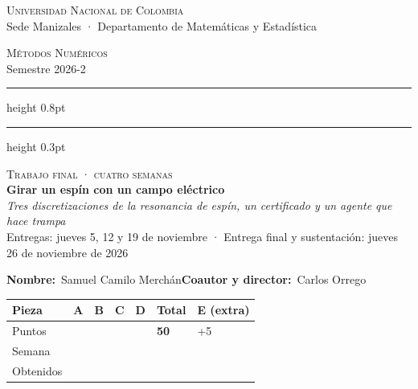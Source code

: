 
\newcommand{\docpie}{Trabajo final · Girar un espín con un campo eléctrico}
\usepackage{fancyvrb}

\newcommand{\cabeceratf}[3]{%
  \thispagestyle{fancy}%
  \noindent\begin{minipage}[t]{0.64\textwidth}\small
    \textsc{Universidad Nacional de Colombia}\\
    Sede Manizales · Departamento de Matemáticas y Estadística
  \end{minipage}\hfill
  \begin{minipage}[t]{0.34\textwidth}\small\raggedleft
    \textsc{Métodos Numéricos}\\
    Semestre 2026-2
  \end{minipage}\par\vspace{5pt}
  \hrule height 0.8pt\vspace{1.5pt}\hrule height 0.3pt
  \vspace{14pt}
  \begin{center}
    {\small\scshape Trabajo final · cuatro semanas}\\[6pt]
    {\LARGE\bfseries #1}\\[5pt]
    {\large\itshape #2}\\[8pt]
    {\small #3}
  \end{center}
  \vspace{4pt}
  \noindent\textbf{Nombre:}\ Samuel Camilo Merchán\hfill\textbf{Coautor y director:}\ Carlos Orrego\par\vspace{10pt}
  \begin{center}
  \begin{tabular}{l*{6}{>{\centering\arraybackslash}p{1.3cm}}}
    \toprule
    Pieza & A & B & C & D & \textbf{Total} & E (extra)\\
    \midrule
    Puntos & 10 & 12 & 14 & 14 & \textbf{50} & +5\\
    Semana & 1 & 2 & 3 & 4 & & 4\\
    \midrule
    Obtenidos\rule[-0.45cm]{0pt}{1.0cm} & & & & & & \\
    \bottomrule
  \end{tabular}
  \end{center}
  \vspace{2pt}}


\cabeceratf{Girar un espín con un campo eléctrico}{Tres discretizaciones de la resonancia de espín, un certificado y un agente que hace trampa}{Entregas: jueves 5, 12 y 19 de noviembre · Entrega final y sustentación: jueves 26 de noviembre de 2026}

